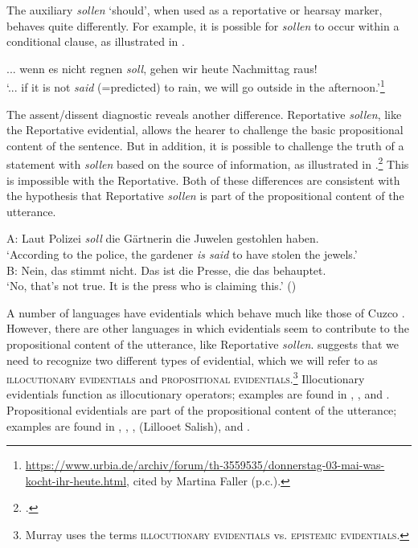 The  auxiliary \textit{sollen} ‘should’, when used as a reportative or hearsay marker, behaves quite differently. For example, it is possible for \textit{sollen} to occur within a conditional clause, as illustrated in .


\ea \label{ex:17.9}
... wenn es nicht regnen \textit{soll}, gehen wir heute Nachmittag raus!\\
‘... if it is not \textit{said} (=predicted) to rain, we will go outside in the afternoon.’\footnote{\url{https://www.urbia.de/archiv/forum/th-3559535/donnerstag-03-mai-was-kocht-ihr-heute.html}, cited by Martina Faller (p.c.).}\\
  
\z


The assent/dissent diagnostic reveals another difference.  Reportative \textit{sollen}, like the  Reportative evidential, allows the hearer to challenge the basic propositional content of the sentence. But in addition, it is possible to challenge the truth of a statement with \textit{sollen} based on the source of information, as illustrated in .\footnote{\citet{Faller2006}.} This is impossible with the  Reportative. Both of these differences are consistent with the hypothesis that  Reportative \textit{sollen} is part of the propositional content of the utterance.


\ea \label{ex:17.10}
A: Laut Polizei \textit{soll} die Gärtnerin die Juwelen gestohlen haben.\\
\glt   ‘According to the police, the gardener \textit{is said} to have stolen the jewels.’\\
\bigskip
B: Nein, das stimmt nicht. Das ist die Presse, die das behauptet.\\
\glt    ‘No, that’s not true. It is the press who is claiming this.’  (\citealt{Faller2006})
\z


A number of languages have evidentials which behave much like those of Cuzco . However, there are other languages in which evidentials seem to contribute to the propositional content of the utterance, like  Reportative \textit{sollen}. \citet{Murray2010} suggests that we need to recognize two different types of evidential, which we will refer to as \textsc{illocutionary evidentials} and \textsc{propositional evidentials}.\footnote{Murray uses the terms \textsc{illocutionary evidentials} vs. \textsc{epistemic evidentials}.} Illocutionary evidentials function as illocutionary operators; examples are found in , , and . Propositional evidentials are part of the propositional content of the utterance; examples are found in , , ,  (Lillooet Salish), and .



